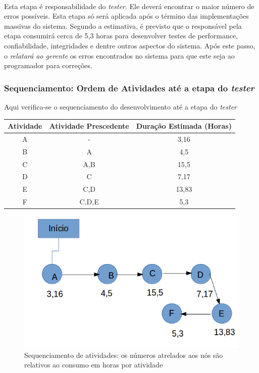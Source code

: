 \documentclass[12pt,a4paper]{article}
\begin{document}
		
		\paragraph{} Esta etapa é responsabilidade do \textit{tester}. Ele deverá encontrar o maior número de erros possíveis. Esta etapa só será aplicada após o término das implementações massivas do sistema. Segundo a estimativa, é previsto que o responsável pela etapa consumirá cerca de 5,3 horas para desenvolver testes de performance, confiabilidade, integridades e dentre outros aspectos do sistema. Após este passo, o \textit{relatará ao gerente} os erros encontrados no sistema para que este seja ao programador para correções.
		\subsubsection{Sequenciamento: Ordem de Atividades até a etapa do \textit{tester}}
		Aqui verifica-se o sequenciamento do desenvolvimento até a etapa do \textit{tester}
		\begin{table}[!ht]
		\centering
        \begin{tabular}{|c|c|c|}
        \hline 
        Atividade & Atividade Prescedente & Duração Estimada (Horas) \\ 
		 \hline 
		A & - & 3,16 \\ 
		\hline 
		B & A & 4,5 \\         
        \hline 
       
        C & A,B & 15,5 \\ 
        \hline 
        D & C & 7,17 \\ 
        \hline 
        E & C,D & 13,83 \\ 
        \hline 	
        F & C,D,E &  5,3 \\
        \hline
        \end{tabular}	 
		\end{table}
		
		\begin{figure}[ht!]
			\centering
			\includegraphics[scale=0.5]{003.png}
			\caption{Sequenciamento de atividades: os números atrelados aos nós são relativos ao consumo em horas por atividade}
		\end{figure}
		
\end{document}
